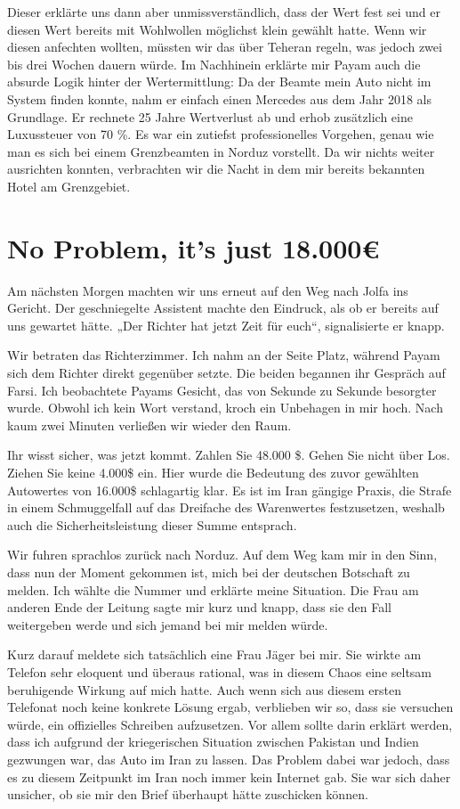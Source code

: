 Dieser erklärte uns dann aber unmissverständlich, dass der Wert fest sei und er diesen Wert bereits mit Wohlwollen möglichst klein gewählt hatte. Wenn wir diesen anfechten wollten, müssten wir das über Teheran regeln, was jedoch zwei bis drei Wochen dauern würde. Im Nachhinein erklärte mir Payam auch die absurde Logik hinter der Wertermittlung: Da der Beamte mein Auto nicht im System finden konnte, nahm er einfach einen Mercedes aus dem Jahr 2018 als Grundlage. Er rechnete 25 Jahre Wertverlust ab und erhob zusätzlich eine Luxussteuer von 70 \%. Es war ein zutiefst professionelles Vorgehen, genau wie man es sich bei einem Grenzbeamten in Norduz vorstellt. Da wir nichts weiter ausrichten konnten, verbrachten wir die Nacht in dem mir bereits bekannten Hotel am Grenzgebiet.

\chapter*{No Problem, it's just 18.000€}

Am nächsten Morgen machten wir uns erneut auf den Weg nach Jolfa ins Gericht. Der geschniegelte Assistent machte den Eindruck, als ob er bereits auf uns gewartet hätte. „Der Richter hat jetzt Zeit für euch“, signalisierte er knapp.

Wir betraten das Richterzimmer. Ich nahm an der Seite Platz, während Payam sich dem Richter direkt gegenüber setzte. Die beiden begannen ihr Gespräch auf Farsi. Ich beobachtete Payams Gesicht, das von Sekunde zu Sekunde besorgter wurde. Obwohl ich kein Wort verstand, kroch ein Unbehagen in mir hoch. Nach kaum zwei Minuten verließen wir wieder den Raum.

Ihr wisst sicher, was jetzt kommt. Zahlen Sie 48.000 \$. Gehen Sie nicht über Los. Ziehen Sie keine 4.000\$ ein. Hier wurde die Bedeutung des zuvor gewählten Autowertes  von 16.000\$ schlagartig klar. Es ist im Iran gängige Praxis, die Strafe in einem Schmuggelfall auf das Dreifache des Warenwertes festzusetzen, weshalb auch die Sicherheitsleistung dieser Summe entsprach.

Wir fuhren sprachlos zurück nach Norduz. Auf dem Weg kam mir in den Sinn, dass nun der Moment gekommen ist, mich bei der deutschen Botschaft zu melden. Ich wählte die Nummer und erklärte meine Situation. Die Frau am anderen Ende der Leitung sagte mir kurz und knapp, dass sie den Fall weitergeben werde und sich jemand bei mir melden würde.

Kurz darauf meldete sich tatsächlich eine Frau Jäger bei mir. Sie wirkte am Telefon sehr eloquent und überaus rational, was in diesem Chaos eine seltsam beruhigende Wirkung auf mich hatte. Auch wenn sich aus diesem ersten Telefonat noch keine konkrete Lösung ergab, verblieben wir so, dass sie versuchen würde, ein offizielles Schreiben aufzusetzen. Vor allem sollte darin erklärt werden, dass ich aufgrund der kriegerischen Situation zwischen Pakistan und Indien gezwungen war, das Auto im Iran zu lassen. Das Problem dabei war jedoch, dass es zu diesem Zeitpunkt im Iran noch immer kein Internet gab. Sie war sich daher unsicher, ob sie mir den Brief überhaupt hätte zuschicken können.

